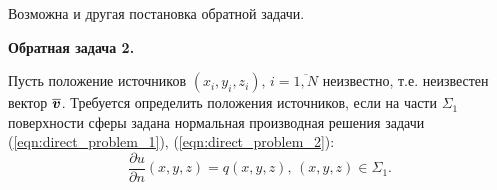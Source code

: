 Возможна и другая постановка обратной задачи.

\textbf{Обратная задача 2.}

Пусть положение источников $(x_i,y_i,z_i)\text{, }i=\overline{1,N}$ неизвестно, т.е. неизвестен вектор $\boldsymbol{\overline{v}}$. Требуется определить положения источников, если на части $\Sigma_1$ поверхности сферы задана нормальная производная решения задачи (\ref{eqn:direct_problem_1}), (\ref{eqn:direct_problem_2}):
\begin{equation}
	\frac{\partial u}{\partial n}(x,y,z)=q(x,y,z) \text{, } (x,y,z) \in \Sigma_1 \text{.}
\end{equation}